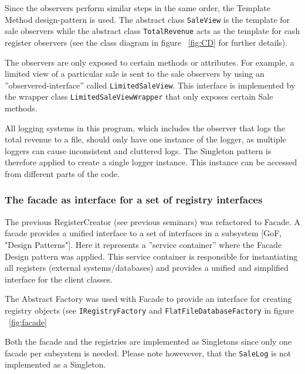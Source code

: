 \documentclass[a4paper]{scrreprt}
\begin{document}
Since the observers perform similar steps in the same order,
the Template Method design-pattern is used.
The abstract class \texttt{SaleView} is the template
for sale observers
while the abstract class \texttt{TotalRevenue}
acts as the template for cash register observers
(see the class diagram in figure ~\ref{fig:CD} for further details).

The observers are only exposed to certain methods or attributes.
For example, a limited view of a particular sale is sent to the
sale observers by using an ''observered-interface'' called
\texttt{LimitedSaleView}.
This interface is implemented by the wrapper class
\texttt{LimitedSaleViewWrapper} that
only exposes certain Sale methods.

All logging systems in this program, which includes the observer that logs the total revenue to a file,
should only have one instance of the logger,
as multiple loggers can cause inconsistent and cluttered logs.
The Singleton pattern is therefore applied to create a
single logger instance.
This instance can be accessed from different parts of the code.

\subsubsection{The facade as interface for a set of registry interfaces}
The previous RegisterCreator (see previous seminars) was refactored to Facade.
A facade provides a unified interface to a
set of interfaces in a subsystem [GoF, "Design Patterns"].
Here it represents a ''service container'' where the Facade Design pattern was applied.
This service container is responsible for instantiating all registers
(external systems/databases) and provides
a unified and simplified interface for the client classes.

The Abstract Factory was used with Facade to provide an
interface for creating registry objects
(see \texttt{IRegistryFactory}
and \texttt{FlatFileDatabaseFactory} in figure ~\ref{fig:facade}

Both the facade and the registries are implemented as
Singletons since only one facade per subsystem is needed.
Please note howevever, that the \texttt{SaleLog}
is not implemented as a Singleton.

\end{document}
